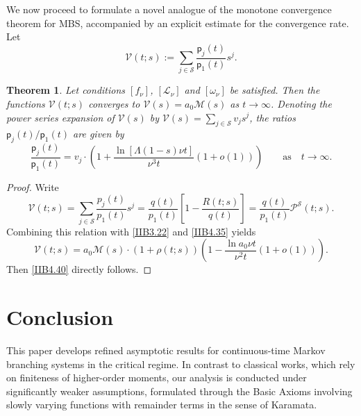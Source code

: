 \documentclass[10pt,reqno]{amsart}
\newtheorem{theorem}{Theorem}
\theoremstyle{definition}
\numberwithin{equation}{section}
\begin{document}
    We now proceed to formulate a novel analogue of the monotone convergence theorem for MBS, accompanied
    by an explicit estimate for the convergence rate. Let
\[
    \mathcal{V}(t;s):=\sum_{j\in\mathcal{S}}{\frac{{{\textsf{p}}_j}(t)}{{{\textsf{p}}_1}(t)}{s^j}}.
\]

\begin{theorem}                      \label{IIBTh9}
    Let conditions $[{f}_{\nu}]$, $[{\mathcal{L}}_{\nu}]$ and $[{\omega}_{\nu}]$ be satisfied. Then the
    functions $\mathcal{V}(t;s)$ converges to $\mathcal{V}(s)={a_0}\mathcal{M}(s)$ as $t\to\infty$. Denoting
    the power series expansion of $\mathcal{V}(s)$ by $\mathcal{V}(s)=\sum_{j\in\mathcal{S}}{{{v}_{j}}{{s}^{j}}}$,
    the ratios ${{\textsf{p}_j}(t)}\big/{{\textsf{p}_1}(t)}$ are given by
\begin{equation}                  \label{IIB4.40}
    \frac{{{\textsf{p}}_j}(t)}{{{\textsf{p}}_{1}}(t)}={{v}_{j}}\cdot\left(1+\frac{\ln[\Lambda(1-s)\nu{t}]}
    {{{\nu}^{3}}t}\left(1+o(1)\right)\right) \qquad {\text{as}} \quad {t\to\infty}.
\end{equation}
\end{theorem}

\begin{proof}
    Write
\[
    \mathcal{V}(t;s)=\sum_{j\in\mathcal{S}}{\frac{{{p}_{j}}(t)}{{{p}_{1}}(t)}{{s}^{j}}}=
    \frac{q(t)}{{{p}_{1}}(t)}\left[1-\frac{R(t;s)}{q(t)}\right]=\frac{q(t)}{{{p}_{1}}(t)}{{\mathcal{P}}^{\mathcal{S}}}(t;s).
\]
    Combining this relation with {\eqref{IIB3.22}} and {\eqref{IIB4.35}} yields
\[
    \mathcal{V}(t;s)={{a}_{0}}\mathcal{M}(s)\cdot\left(1+\rho(t;s)\right)
    \left(1-\frac{\ln{{a}_{0}}\nu{t}}{{{\nu}^{2}}t}\left(1+o(1)\right)\right).
\]
    Then {\eqref{IIB4.40}} directly follows.
\end{proof}



\section{Conclusion}             \label{IIBSec5}

    This paper develops refined asymptotic results for continuous-time Markov branching systems in the critical
    regime. In contrast to classical works, which rely on finiteness of higher-order moments, our analysis is
    conducted under significantly weaker assumptions, formulated through the Basic Axioms involving slowly
    varying functions with remainder terms in the sense of Karamata.
\end{document}
